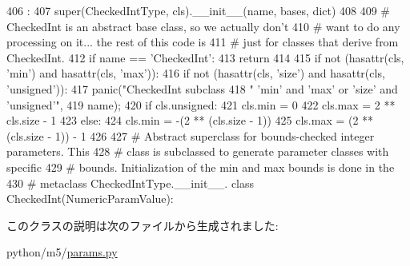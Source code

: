 \begin{DoxyCode}
406                                         :
407         super(CheckedIntType, cls).__init__(name, bases, dict)
408 
409         # CheckedInt is an abstract base class, so we actually don't
410         # want to do any processing on it... the rest of this code is
411         # just for classes that derive from CheckedInt.
412         if name == 'CheckedInt':
413             return
414 
415         if not (hasattr(cls, 'min') and hasattr(cls, 'max')):
416             if not (hasattr(cls, 'size') and hasattr(cls, 'unsigned')):
417                 panic("CheckedInt subclass %
418                       "    'min' and 'max' or 'size' and 'unsigned'\n",
419                       name);
420             if cls.unsigned:
421                 cls.min = 0
422                 cls.max = 2 ** cls.size - 1
423             else:
424                 cls.min = -(2 ** (cls.size - 1))
425                 cls.max = (2 ** (cls.size - 1)) - 1
426 
427 # Abstract superclass for bounds-checked integer parameters.  This
428 # class is subclassed to generate parameter classes with specific
429 # bounds.  Initialization of the min and max bounds is done in the
430 # metaclass CheckedIntType.__init__.
class CheckedInt(NumericParamValue):
\end{DoxyCode}


このクラスの説明は次のファイルから生成されました:\begin{DoxyCompactItemize}
\item 
python/m5/\hyperlink{params_8py}{params.py}\end{DoxyCompactItemize}
